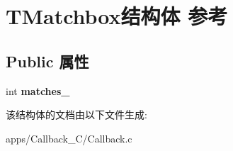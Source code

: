 \hypertarget{struct_t_matchbox}{\section{T\+Matchbox结构体 参考}
\label{struct_t_matchbox}
}
\subsection*{Public 属性}
\begin{DoxyCompactItemize}
\item 
\hypertarget{struct_t_matchbox_af079ec84dae487dbd0129f5853b2de64}{int {\bfseries matches\+\_\+}}\label{struct_t_matchbox_af079ec84dae487dbd0129f5853b2de64}

\end{DoxyCompactItemize}


该结构体的文档由以下文件生成\+:\begin{DoxyCompactItemize}
\item 
apps/\+Callback\+\_\+\+C/Callback.\+c\end{DoxyCompactItemize}
